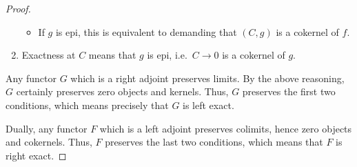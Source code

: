 \documentclass[main.tex]{subfiles}
\begin{document}
\begin{proof}
\begin{enumerate}
\begin{itemize}
        \item If $g$ is epi, this is equivalent to demanding that $(C, g)$ is a cokernel of $f$.
      \end{itemize}

    \item Exactness at $C$ means that $g$ is epi, i.e.\ $C \to 0$ is a cokernel of $g$.
  \end{enumerate}
  Any functor $G$ which is a right adjoint preserves limits. By the above reasoning, $G$ certainly preserves zero objects and kernels. Thus, $G$ preserves the first two conditions, which means precisely that $G$ is left exact.

  Dually, any functor $F$ which is a left adjoint preserves colimits, hence zero objects and cokernels. Thus, $F$ preserves the last two conditions, which means that $F$ is right exact.
\end{proof}
\end{document}
